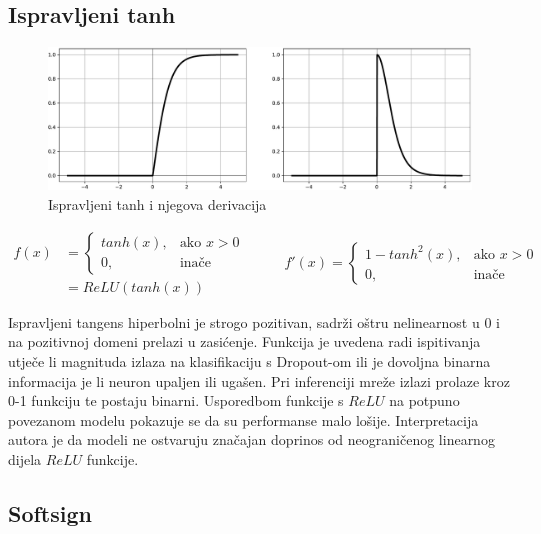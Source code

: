 \documentclass[times, utf8, numeric, diplomski]{fer}
\begin{document}
\subsection{Ispravljeni tanh}

\begin{figure}[H]
\includegraphics[width=\textwidth]{func_Rectified_tanh.pdf}
\centering
\caption{Ispravljeni tanh i njegova derivacija}
\label{fig:rectified_tanh}
\end{figure}

\begin{equation}
\label{eq:rectanh}
\begin{split}
f(x) &=
\begin{cases}
tanh(x),	 		& \text{ako } x > 0 \\
0,	& \text{inače}
\end{cases} \\
&= ReLU(tanh(x))
\end{split}
\qquad
\begin{split}
f'(x) =
\begin{cases}
1-tanh^2(x),	 		& \text{ako } x > 0 \\
0,	& \text{inače}
\end{cases}
\end{split}
\end{equation}

Ispravljeni tangens hiperbolni je strogo pozitivan, sadrži oštru nelinearnost u $0$ i na pozitivnoj domeni prelazi u zasićenje. Funkcija je uvedena radi ispitivanja utječe li magnituda izlaza na klasifikaciju s Dropout-om ili je dovoljna binarna informacija je li neuron upaljen ili ugašen. Pri inferenciji mreže izlazi prolaze kroz 0-1 funkciju te postaju binarni. Usporedbom funkcije s $ReLU$ na potpuno povezanom modelu pokazuje se da su performanse malo lošije. Interpretacija autora je da modeli ne ostvaruju značajan doprinos od neograničenog linearnog dijela $ReLU$ funkcije. \citep{rectanh}

\subsection{Softsign}
\end{document}
